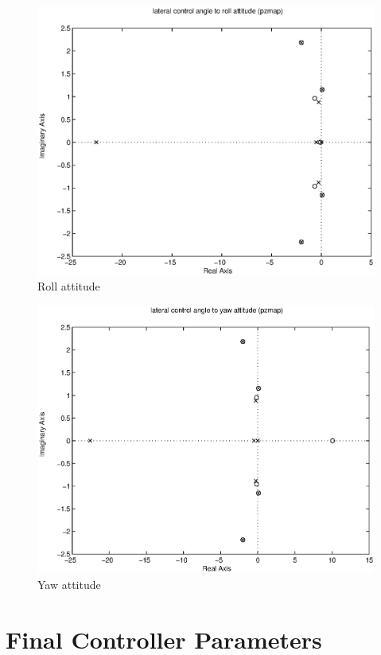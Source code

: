 \documentclass{sydeStyle}
\begin{document}
\begin{figure}[h]
    \centering
    \includegraphics[width=0.8\columnwidth]{figs/28pz}
    \caption{Roll attitude}
    \label{fig:lat4}
\end{figure}

\begin{figure}[h]
    \centering
    \includegraphics[width=0.8\columnwidth]{figs/29pz}
    \caption{Yaw attitude}
    \label{fig:lat5}
\end{figure}

\chapter{Final Controller Parameters}
\label{sec:ctrlvals}
\end{document}

